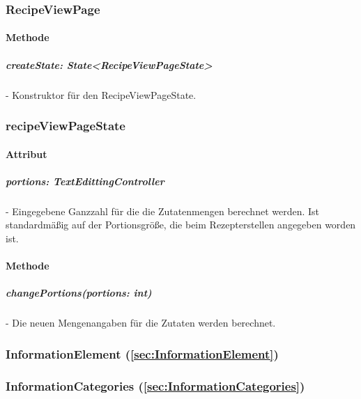 \documentclass[parskip=full]{scrartcl}
\begin{document}
    \subsubsection{RecipeViewPage}
        \paragraph*{Methode}
            \subparagraph*{createState: State<RecipeViewPageState>} - Konstruktor für den RecipeViewPageState.
        
    \subsubsection{recipeViewPageState}
        \paragraph*{Attribut}
            \subparagraph*{portions: TextEdittingController} - Eingegebene Ganzzahl für die die Zutatenmengen berechnet werden. Ist standardmäßig auf der Portionsgröße, die beim Rezepterstellen angegeben worden ist.
    
        \paragraph*{Methode}
            \subparagraph*{changePortions(portions: int)} - Die neuen Mengenangaben für die Zutaten werden berechnet.

    \subsubsection*{InformationElement (\autoref{sec:InformationElement})}

    \subsubsection{InformationCategories (\autoref{sec:InformationCategories})}
\end{document}
